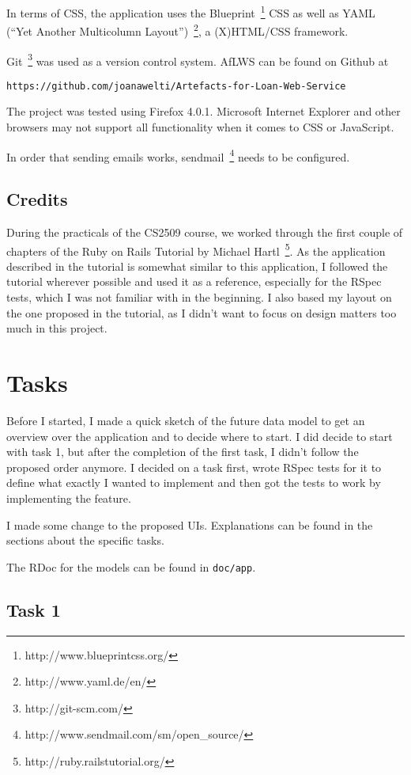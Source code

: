 \documentclass[fontsize=12pt,paper=a4]{scrartcl}
\begin{document}
In terms of CSS, the application uses the Blueprint~\footnote{http://www.blueprintcss.org/} CSS as well as YAML (``Yet Another Multicolumn Layout'')~\footnote{http://www.yaml.de/en/}, a (X)HTML/CSS framework.
 
Git~\footnote{http://git-scm.com/} was used as a version control system. AfLWS can be found on Github at
\begin{verbatim}
https://github.com/joanawelti/Artefacts-for-Loan-Web-Service
\end{verbatim}
The project was tested using Firefox 4.0.1. Microsoft Internet Explorer and other browsers may not support all functionality when it comes to CSS or JavaScript.

In order that sending emails works, sendmail~\footnote{http://www.sendmail.com/sm/open\_source/} needs to be configured.

\subsection{Credits}
During the practicals of the CS2509 course, we worked through the first couple of chapters of the Ruby on Rails Tutorial by Michael Hartl~\footnote{http://ruby.railstutorial.org/}. As the application described in the tutorial is somewhat similar to this application, I followed the tutorial wherever possible and used it as a reference, especially for the RSpec tests, which I was not familiar with in the beginning.
I also based my layout on the one proposed in the tutorial, as I didn't want to focus on design matters too much in this project.

\section{Tasks}
Before I started, I made a quick sketch of the future data model to get an overview over the application and to decide where to start. I did decide to start with task 1, but after the completion of the first task, I didn't follow the proposed order anymore. I decided on a task first, wrote RSpec tests for it to define what exactly I wanted to implement and then got the tests to work by implementing the feature.

I made some change to the proposed UIs. Explanations can be found in the sections about the specific tasks.
 
The RDoc for the models can be found in \verb|doc/app|. 
 
\subsection{Task 1}
\end{document}
